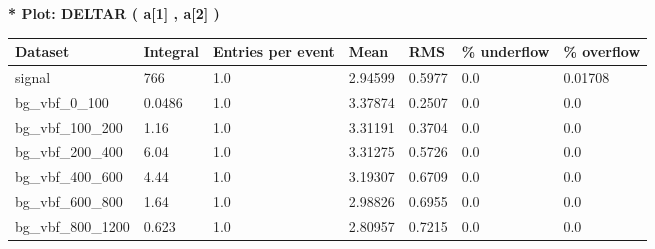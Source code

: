 \documentclass[a4paper, 10pt]{article}
\begin{document}
\textbf{* Plot: DELTAR ( a[1] , a[2] ) }\\
   \begin{table}[H]
  \begin{center}
    \begin{tabular}{|m{23.0mm}|m{23.0mm}|m{18.0mm}|m{19.0mm}|m{19.0mm}|m{19.0mm}|m{19.0mm}|}
      \hline
      {\cellcolor{yellow}         Dataset}& {\cellcolor{yellow}         Integral}& {\cellcolor{yellow}         Entries per event}& {\cellcolor{yellow}         Mean}& {\cellcolor{yellow}         RMS}& {\cellcolor{yellow}         \% underflow}& {\cellcolor{yellow}         \% overflow}\\
      \hline
      {\cellcolor{white}         signal}& {\cellcolor{white}         766}& {\cellcolor{white}         1.0}& {\cellcolor{white}         2.94599}& {\cellcolor{white}         0.5977}& {\cellcolor{green}         0.0}& {\cellcolor{green}         0.01708}\\
      \hline
      {\cellcolor{white}         bg\_vbf\_0\_100}& {\cellcolor{white}         0.0486}& {\cellcolor{white}         1.0}& {\cellcolor{white}         3.37874}& {\cellcolor{white}         0.2507}& {\cellcolor{green}         0.0}& {\cellcolor{green}         0.0}\\
      \hline
      {\cellcolor{white}         bg\_vbf\_100\_200}& {\cellcolor{white}         1.16}& {\cellcolor{white}         1.0}& {\cellcolor{white}         3.31191}& {\cellcolor{white}         0.3704}& {\cellcolor{green}         0.0}& {\cellcolor{green}         0.0}\\
      \hline
      {\cellcolor{white}         bg\_vbf\_200\_400}& {\cellcolor{white}         6.04}& {\cellcolor{white}         1.0}& {\cellcolor{white}         3.31275}& {\cellcolor{white}         0.5726}& {\cellcolor{green}         0.0}& {\cellcolor{green}         0.0}\\
      \hline
      {\cellcolor{white}         bg\_vbf\_400\_600}& {\cellcolor{white}         4.44}& {\cellcolor{white}         1.0}& {\cellcolor{white}         3.19307}& {\cellcolor{white}         0.6709}& {\cellcolor{green}         0.0}& {\cellcolor{green}         0.0}\\
      \hline
      {\cellcolor{white}         bg\_vbf\_600\_800}& {\cellcolor{white}         1.64}& {\cellcolor{white}         1.0}& {\cellcolor{white}         2.98826}& {\cellcolor{white}         0.6955}& {\cellcolor{green}         0.0}& {\cellcolor{green}         0.0}\\
      \hline
      {\cellcolor{white}         bg\_vbf\_800\_1200}& {\cellcolor{white}         0.623}& {\cellcolor{white}         1.0}& {\cellcolor{white}         2.80957}& {\cellcolor{white}         0.7215}& {\cellcolor{green}         0.0}& {\cellcolor{green}         0.0}\\

\end{tabular}
\end{center}
\end{table}
\end{document}
